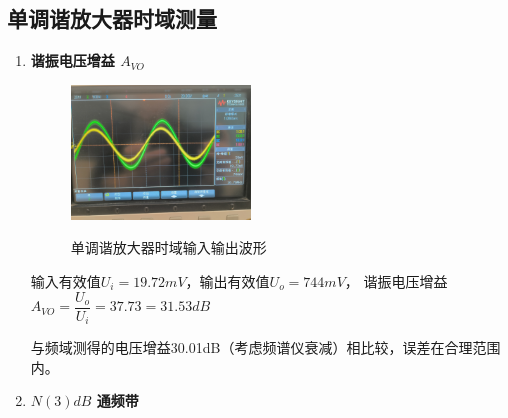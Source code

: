 \documentclass[UTF8]{ctexart}
\begin{document}
\subsection{单调谐放大器时域测量}
\begin{enumerate}[(1)]
    \item \noindent\textbf{谐振电压增益 $A_{VO}$}
    
    \begin{figure}[H]
        \centering
        \includegraphics[width=0.45\textwidth]{pics/3.2.1.png}
        ~\\
        \caption{单调谐放大器时域输入输出波形}\label{fig:3.2.1}
    \end{figure}
    \vspace{-2em}
    输入有效值$U_i=19.72mV$，输出有效值$U_o=744mV$，
    谐振电压增益 $A_{VO}=\dfrac{U_o}{U_i}=37.73=31.53dB$

    与频域测得的电压增益30.01dB（考虑频谱仪衰减）相比较，误差在合理范围内。
    
    \item \noindent\textbf{$N(3)dB$ 通频带}
    

\end{enumerate}
\end{document}

